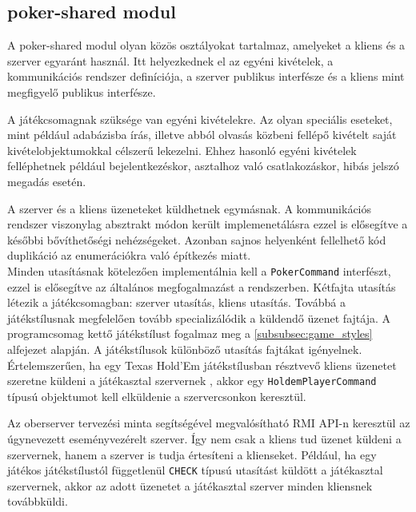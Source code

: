 \subsection{poker-shared modul}
A poker-shared modul olyan közös osztályokat tartalmaz, amelyeket a kliens és a szerver egyaránt használ. Itt helyezkednek el az egyéni kivételek, a kommunikációs rendszer definíciója, a szerver publikus interfésze és a kliens mint megfigyelő publikus interfésze.

A játékcsomagnak szüksége van egyéni kivételekre. Az olyan speciális eseteket, mint például adabázisba írás, illetve abból olvasás közbeni fellépő kivételt saját kivételobjektumokkal célszerű lekezelni. Ehhez hasonló egyéni kivételek felléphetnek például bejelentkezéskor, asztalhoz való csatlakozáskor, hibás jelszó megadás esetén.

A szerver és a kliens üzeneteket küldhetnek egymásnak. A kommunikációs rendszer viszonylag absztrakt módon került implemenetálásra ezzel is elősegítve a későbbi bővíthetőségi nehézségeket. Azonban sajnos helyenként fellelhető kód duplikáció az enumerációkra való építkezés miatt. \\
Minden utasításnak kötelezően implementálnia kell a \texttt{PokerCommand} interfészt, ezzel is elősegítve az általános megfogalmazást a rendszerben. Kétfajta utasítás létezik a játékcsomagban: szerver utasítás, kliens utasítás.
Továbbá a játékstílusnak megfelelően tovább specializálódik a küldendő üzenet fajtája. A programcsomag kettő játékstílust fogalmaz meg a \ref{subsubsec:game_styles} alfejezet alapján. A játékstílusok különböző utasítás fajtákat igényelnek. Értelemszerűen, ha egy Texas Hold'Em játékstílusban résztvevő kliens üzenetet szeretne küldeni a játékasztal szervernek , akkor egy \texttt{HoldemPlayerCommand} típusú objektumot kell elküldenie a szervercsonkon keresztül.

Az oberserver tervezési minta segítségével megvalósítható RMI API-n keresztül az úgynevezett eseményvezérelt szerver. Így nem csak a kliens tud üzenet küldeni a szervernek, hanem a szerver is tudja értesíteni a klienseket. Például, ha egy játékos játékstílustól függetlenül \texttt{CHECK} típusú utasítást küldött a játékasztal szervernek, akkor az adott üzenetet a játékasztal szerver minden kliensnek továbbküldi.

